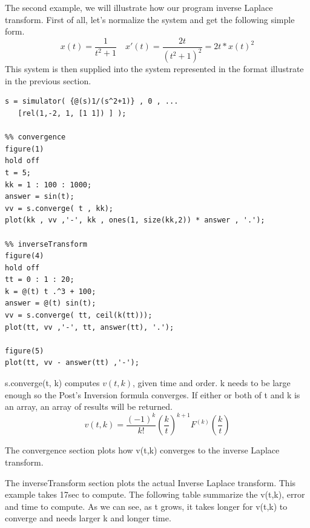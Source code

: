 \documentclass[12pt]{article}
\begin{document}
The second example, we will illustrate how our program inverse Laplace transform. First of all, let's normalize the system and get the following simple form.
\begin{equation}
x(t) = \frac{1}{t^2 + 1} \quad x'(t) = \frac{2t}{(t^2 + 1)^2} = 2t *x(t)^2
\end{equation}
This system is then supplied into the system represented in the format illustrate in the previous section.
\begin{lstlisting}
s = simulator( {@(s)1/(s^2+1)} , 0 , ...
   [rel(1,-2, 1, [1 1]) ] );
   
%% convergence
figure(1)
hold off
t = 5;
kk = 1 : 100 : 1000;
answer = sin(t);
vv = s.converge( t , kk);
plot(kk , vv ,'-', kk , ones(1, size(kk,2)) * answer , '.');

%% inverseTransform
figure(4)
hold off
tt = 0 : 1 : 20;
k = @(t) t .^3 + 100;
answer = @(t) sin(t);
vv = s.converge( tt, ceil(k(tt)));
plot(tt, vv ,'-', tt, answer(tt), '.');

figure(5)
plot(tt, vv - answer(tt) ,'-');
\end{lstlisting}

s.converge(t, k) computes $v(t, k)$, given time and order. k needs to be large enough so the Post's Inversion formula converges.
If either or both of t and k is an array, an array of results will be returned.
\begin{equation*}
v(t, k) = \frac{(-1)^{k}}{k!} \left(\frac{k}{t}\right)^{k+1}  F^{(k)} \left(\frac{k}{t}\right)
\end{equation*}

The convergence section plots how v(t,k) converges to the inverse Laplace transform.

The inverseTransform section plots the actual Inverse Laplace transform. This example takes 17sec to compute.
The following table summarize the v(t,k), error and time to compute. As we can see, as t grows, it takes longer for v(t,k) to converge and needs larger k and longer time.
\end{document}
